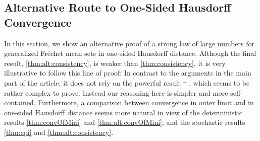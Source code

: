 \documentclass{scrartcl}
\theoremstyle{plain}\newtheorem{theorem}{Theorem}[section]
\theoremstyle{definition}
\theoremstyle{remark}
\providecommand{\DIFaddtex}[1]{{\protect\color{blue}\uwave{#1}}} %
\providecommand{\DIFdeltex}[1]{{\protect\color{red}\sout{#1}}}                      %
\providecommand{\DIFaddbegin}{} %
\providecommand{\DIFaddend}{} %
\providecommand{\DIFdelbegin}{} %
\providecommand{\DIFdelend}{} %
\providecommand{\DIFadd}[1]{\texorpdfstring{\DIFaddtex{#1}}{#1}} %
\providecommand{\DIFdel}[1]{\texorpdfstring{\DIFdeltex{#1}}{}} %
\newcommand{\DIFscaledelfig}{0.5}
\newlength{\DIFdelgraphicswidth} %
\newlength{\DIFdelgraphicsheight} %
\newcommand{\DIFaddincludegraphics}[2][]{{\color{blue}\fbox{\DIFOincludegraphics[#1]{#2}}}} %
\newcommand{\DIFdelincludegraphics}[2][]{%
\sbox{\DIFdelgraphicsbox}{\DIFOincludegraphics[#1]{#2}}%
\settoboxwidth{\DIFdelgraphicswidth}{\DIFdelgraphicsbox} %
\settoboxtotalheight{\DIFdelgraphicsheight}{\DIFdelgraphicsbox} %
\scalebox{\DIFscaledelfig}{%
\parbox[b]{\DIFdelgraphicswidth}{\usebox{\DIFdelgraphicsbox}\\[-\baselineskip] \rule{\DIFdelgraphicswidth}{0em}}\llap{\resizebox{\DIFdelgraphicswidth}{\DIFdelgraphicsheight}{%
\setlength{\unitlength}{\DIFdelgraphicswidth}%
\begin{picture}(1,1)%
\thicklines\linethickness{2pt} %
{\color[rgb]{1,0,0}\put(0,0){\framebox(1,1){}}}%
{\color[rgb]{1,0,0}\put(0,0){\line( 1,1){1}}}%
{\color[rgb]{1,0,0}\put(0,1){\line(1,-1){1}}}%
\end{picture}%
}\hspace*{3pt}}} %
} %
\DeclareRobustCommand{\DIFaddbegin}{\DIFOaddbegin \let\includegraphics\DIFaddincludegraphics} %
\DeclareRobustCommand{\DIFaddend}{\DIFOaddend \let\includegraphics\DIFOincludegraphics} %
\DeclareRobustCommand{\DIFdelbegin}{\DIFOdelbegin \let\includegraphics\DIFdelincludegraphics} %
\DeclareRobustCommand{\DIFdelend}{\DIFOaddend \let\includegraphics\DIFOincludegraphics} %
\begin{document}
\begin{appendix}
 \section{Alternative Route to One-Sided Hausdorff Convergence}\label{sec:alt}
In this section, we show an alternative proof of a strong law of large numbers for generalized Fréchet mean sets in one-sided Hausdorff distance. Although the final result, \autoref{thm:alt:consistency}, is weaker than \autoref{thm:consistency}, it is very illustrative to follow this line of proof:
In contrast to the arguments in the main part of the article, it does not rely on the powerful result \DIFdelbegin \DIFdel{\mbox{%
\cite[Theorem 1.1]{korf01}}\hskip0pt%
}\DIFdelend \DIFaddbegin \DIFadd{\mbox{%
\cite[Theorem 8.2]{korf01}}\hskip0pt%
}\DIFaddend , which seems to be rather complex to prove. Instead our reasoning here is simpler and more self-contained.
Furthermore, a comparison between convergence in outer limit and in one-sided Hausdorff distance seems more natural in view of the deterministic results \autoref{thm:convOfMini} and \autoref{thm:alt:convOfMini}, and the stochastic results \autoref{thm:epi} and \autoref{thm:alt:consistency}.

\end{appendix}
\end{document}
